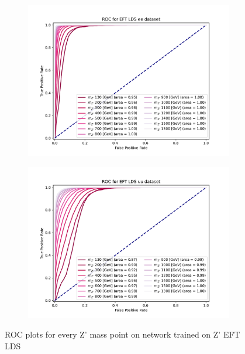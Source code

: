 \documentclass[12pt, a4paper]{book}
\begin{document}
\begin{figure}[!ht]
	\centering
	\begin{subfigure}[b]{0.49\textwidth}
      \centering
      \includegraphics[width=1\textwidth]{XGBoost/EFT_LDS/ROC_ee.pdf}
      \end{subfigure}
   \hfill
   \begin{subfigure}[b]{0.49\textwidth}
      \centering
      \includegraphics[width=1\textwidth]{XGBoost/EFT_LDS/ROC_uu.pdf}
      \end{subfigure}
   \caption{ROC plots for every Z' mass point on network trained on Z' EFT LDS}\label{fig:EFT_LDS_ROCS}
\end{figure}
\end{document}
